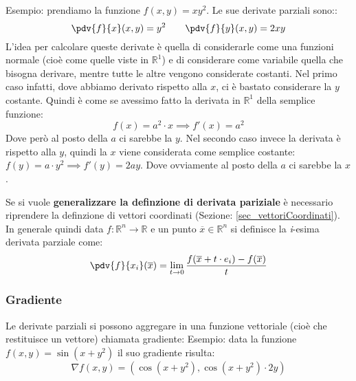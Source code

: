 Esempio: prendiamo la funzione $f(x, y) = xy^2$. Le sue derivate parziali sono::
\begin{equation*}
	\pdv{f}{x} (x, y) = y^2 \qquad \pdv{f}{y} (x, y) = 2xy
\end{equation*}
L'idea per calcolare queste derivate è quella di considerarle come una funzioni normale (cioè come quelle viste in $\mathbb{R}^1$) e di considerare come variabile quella che bisogna derivare, mentre tutte le altre vengono considerate costanti. Nel primo caso infatti, dove abbiamo derivato rispetto alla $x$, ci è bastato considerare la $y$ costante. Quindi è come se avessimo fatto la derivata in $\mathbb{R}^1$ della semplice funzione:
\begin{equation*}
	f(x) = a^2 \cdot x \implies f'(x) = a^2
\end{equation*}
Dove però al posto della $a$ ci sarebbe la $y$. Nel secondo caso invece la derivata è rispetto alla $y$, quindi la $x$ viene considerata come semplice costante: $f(y) = a \cdot y^2 \implies f'(y) = 2ay$. Dove ovviamente al posto della $a$ ci sarebbe la $x$.\bigbreak

Se si vuole \textbf{generalizzare la definzione di derivata pariziale} è necessario riprendere la definzione di vettori coordinati (Sezione: \ref{sec_vettoriCoordinati}). In generale quindi data $f: \mathbb{R}^n \to \mathbb{R}$ e un punto $\overline{x} \in \mathbb{R}^n$ si definisce la \textit{i}-esima derivata parziale come:
\begin{equation*}
	\pdv{f}{x_i}(\overline{x}) = \lim_{t \to 0} \dfrac{f(\overline{x} + t \cdot e_i) - f(\overline{x})}{t}
\end{equation*}

\subsubsection{Gradiente}
Le derivate parziali si possono aggregare in una funzione vettoriale (cioè che restituisce un vettore) chiamata gradiente:
Esempio: data la funzione $f(x, y) = \sin(x + y^2)$ il suo gradiente risulta:
\begin{equation*}
	\nabla f (x, y) = (\cos(x + y^2), \cos(x + y^2) \cdot 2y)
\end{equation*}

